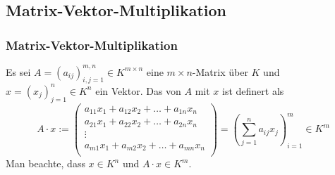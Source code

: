 \subsection{Matrix-Vektor-Multiplikation}
\begin{frame}\frametitle{Matrix-Vektor-Multiplikation}
Es sei $A=(a_{ij})_{i,j=1}^{m,n} \in K^{m\times n}$ eine $m\times n$-Matrix über $K$ und $x=(x_j)_{j=1}^n\in K^n$ ein Vektor. Das  von $A$ mit $x$ ist definert als
		$$
		A\cdot x 
		:=
		\begin{pmatrix}
			a_{11}x_1 + a_{12}x_2 + \ldots + a_{1n}x_n \\
			a_{21}x_1 + a_{22}x_2 + \ldots + a_{2n}x_n \\
			\vdots				\\
			a_{m1}x_1 + a_{m2}x_2 + \ldots + a_{mn}x_n\\
		\end{pmatrix}
		=
		\left(
			\sum_{j=1}^na_{ij}x_j
		\right)_{i=1}^{m} \in K^m
		$$\pause
\vfill
Man beachte, dass $x \in K^n$ und $A\cdot x \in K^m$.
\end{frame}
%
